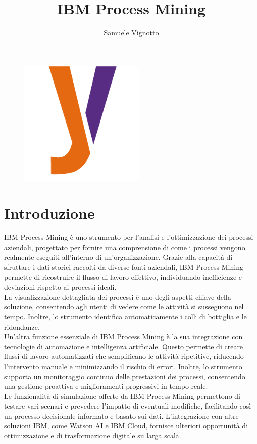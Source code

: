 \documentclass{article}
\title{\Huge{\textbf{IBM Process Mining}}\vspace{-1em}}
\author{Samuele Vignotto}
\date{}
\begin{document}
\maketitle
\begin{figure}[h]
  \centering
  \includegraphics[width=6cm, height=6cm]{Logo/Y_LOGO-SOLO.png}
  \label{fig:immagine}
\end{figure}

\newpage
\tableofcontents
\newpage

\section{Introduzione}

IBM Process Mining è uno strumento per l'analisi e l'ottimizzazione dei processi aziendali, progettato per fornire una comprensione di come i processi vengono realmente eseguiti all'interno di un'organizzazione. Grazie alla capacità di sfruttare i dati storici raccolti da diverse fonti aziendali, IBM Process Mining permette di ricostruire il flusso di lavoro effettivo, individuando inefficienze e deviazioni rispetto ai processi ideali.\\
La visualizzazione dettagliata dei processi è uno degli aspetti chiave della soluzione, consentendo agli utenti di vedere come le attività si susseguono nel tempo. Inoltre, lo strumento identifica automaticamente i colli di bottiglia e le ridondanze.\\
Un'altra funzione essenziale di IBM Process Mining è la sua integrazione con tecnologie di automazione e intelligenza artificiale. Questo permette di creare flussi di lavoro automatizzati che semplificano le attività ripetitive, riducendo l'intervento manuale e minimizzando il rischio di errori. Inoltre, lo strumento supporta un monitoraggio continuo delle prestazioni dei processi, consentendo una gestione proattiva e miglioramenti progressivi in tempo reale.\\
Le funzionalità di simulazione offerte da IBM Process Mining permettono di testare vari scenari e prevedere l’impatto di eventuali modifiche, facilitando così un processo decisionale informato e basato sui dati. L’integrazione con altre soluzioni IBM, come Watson AI e IBM Cloud, fornisce ulteriori opportunità di ottimizzazione e di trasformazione digitale su larga scala.
\end{document}
